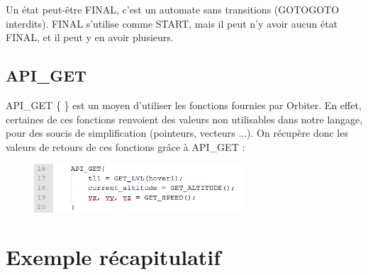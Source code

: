 \documentclass[a4paper,11pt]{article}
\begin{document}
            Un état peut-être FINAL, c'est un automate sans transitions (GOTOGOTO interdits). FINAL s'utilise comme START, mais il peut n'y avoir aucun état FINAL, et il peut y en avoir plusieurs.

    \subsection{API\_GET}
        API\_GET \{ \} est un moyen d'utiliser les fonctions fournies par Orbiter. En effet, certaines de ces fonctions renvoient des valeurs non utilisables dans notre langage, pour des soucis de simplification (pointeurs, vecteurs ...). On récupère donc les valeurs de retours de ces fonctions grâce à API\_GET :

        \begin{figure}[!h]
                    \begin{center}
                        \includegraphics[width=0.7\textwidth]{img/apiget.png}
                    \end{center}
        \end{figure}

        \pagebreak
        \section{Exemple récapitulatif}
\end{document}
